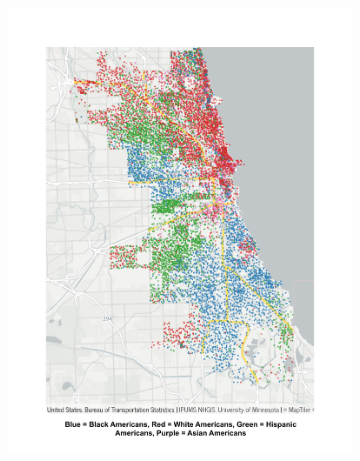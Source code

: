 \documentclass[12pt]{article}
\begin{document}
\begin{figure}[h!]
\centering
    \caption{Population by Race and Income}
    \begin{subfigure}[b]{0.52\textwidth}
         \centering
         \includegraphics[width=\textwidth]{Pset1/Figures/racial_map.pdf}
         \label{fig:racial_divide}
    \end{subfigure}  
    \begin{subfigure}[b]{0.45\textwidth}
         \centering

\end{subfigure}
\end{figure}
\end{document}
